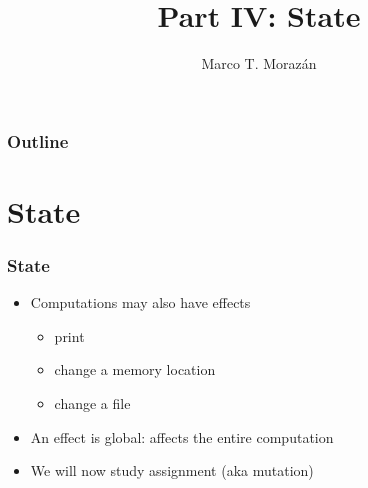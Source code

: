 \documentclass{beamer}
\begin{document}
\title{Part IV: State}
\author{Marco T. Moraz\'{a}n}
\date{}

\begin{frame}
\titlepage
\end{frame}

\begin{frame}
\frametitle{Outline}
\tableofcontents
\end{frame}


\section{State}

\begin{frame}[fragile]
\frametitle{State}
\begin{scriptsize}
\begin{itemize}
\item<1-> Computations may also have effects
\begin{itemize}
\item print
\item change a memory location
\item change a file
\end{itemize}

\item<2-> An effect is global: affects the entire computation

\item<3-> We will now study assignment (aka mutation)

\end{itemize}
\end{scriptsize}
\end{frame}
\end{document}
